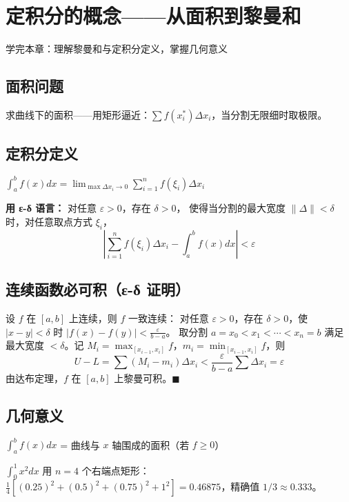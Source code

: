 \chapter{定积分的概念——从面积到黎曼和}
\begin{applicationbox}
学完本章：理解黎曼和与定积分定义，掌握几何意义
\end{applicationbox}

\section{面积问题} 求曲线下的面积——用矩形逼近：\(\sum f(x_i^*)\Delta x_i\)，当分割无限细时取极限。

\section{定积分定义} \(\int_a^b f(x)dx = \lim_{\max\Delta x_i\to0}\sum_{i=1}^n f(\xi_i)\Delta x_i\)

\textbf{用 ε-δ 语言：} 对任意 \(\varepsilon>0\)，存在 \(\delta>0\)，
使得当分割的最大宽度 \(\|\Delta\|<\delta\) 时，对任意取点方式 \(\xi_i\)，
\[
\left|\sum_{i=1}^n f(\xi_i)\Delta x_i - \int_a^b f(x)dx\right| < \varepsilon
\]

\section{连续函数必可积（ε-δ 证明）}
设 \(f\) 在 \([a,b]\) 上连续，则 \(f\) 一致连续：
对任意 \(\varepsilon>0\)，存在 \(\delta>0\)，使 \(|x-y|<\delta\) 时 \(|f(x)-f(y)|<\frac{\varepsilon}{b-a}\)。
取分割 \(a=x_0<x_1<\cdots<x_n=b\) 满足最大宽度 \(<\delta\)。记
\(M_i=\max_{[x_{i-1},x_i]}f\)，\(m_i=\min_{[x_{i-1},x_i]}f\)，则
\[
U-L = \sum (M_i-m_i)\Delta x_i < \frac{\varepsilon}{b-a}\sum\Delta x_i = \varepsilon
\]
由达布定理，\(f\) 在 \([a,b]\) 上黎曼可积。\(\blacksquare\)

\section{几何意义} \(\int_a^b f(x)dx\) = 曲线与 \(x\) 轴围成的面积（若 \(f\ge0\)）

\begin{examplebox}[1——黎曼和近似]
\(\int_0^1 x^2 dx\) 用 \(n=4\) 个右端点矩形：\(\frac14[(0.25)^2+(0.5)^2+(0.75)^2+1^2]=0.46875\)，精确值 \(1/3\approx0.333\)。
\end{examplebox}

